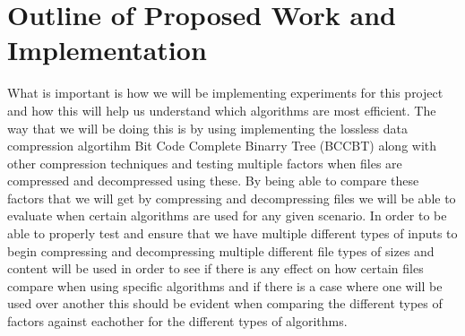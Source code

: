 \documentclass[11pt]{article}
\begin{document}
\section*{Outline of Proposed Work and Implementation}
What is important is how we will be implementing experiments for this project and how this will
help us understand which algorithms are most efficient.  The way that we will be doing this is by
using implementing the lossless data compression algortihm Bit Code Complete Binarry Tree (BCCBT) 
along with other compression techniques and testing multiple factors when files are compressed and 
decompressed using these.  By being able to compare these factors that we will get by compressing and
decompressing files we will be able to evaluate when certain algorithms are used for any given scenario.
In order to be able to properly test and ensure that we have multiple different types of inputs to begin 
compressing and decompressing multiple different file types of sizes and content will be used in order to 
see if there is any effect on how certain files compare when using specific algorithms and if there is a case
where one will be used over another this should be evident when comparing the different types of 
factors against eachother for the different types of algorithms.
\end{document}

